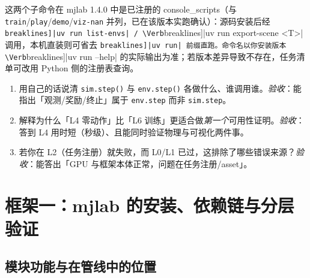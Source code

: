 \begin{note}
这两个子命令在 mjlab 1.4.0 中是已注册的 console\_scripts（与 \verb|train|/\allowbreak\verb|play|/\allowbreak\verb|demo|/\allowbreak\verb|viz-nan| 并列，已在该版本实跑确认）：源码安装后经 \Verb[breaklines]|uv run list-envs| / \Verb[breaklines]|uv run export-scene <T>| 调用，本机直装则可省去 \Verb[breaklines]|uv run| 前缀直跑。命令名以你安装版本 \Verb[breaklines]|uv run --help| 的实际输出为准；若版本差异导致不存在，任务清单可改用 Python 侧的注册表查询。
\end{note}


\begin{practice}[概念主线自检]
\begin{enumerate}
  \item 用自己的话说清 \verb|sim.step()| 与 \verb|env.step()| 各做什么、谁调用谁。\emph{验收}：能指出「观测/奖励/终止」属于 \verb|env.step| 而非 \verb|sim.step|。
  \item 解释为什么「L4 零动作」比「L6 训练」更适合做\emph{第一个}可用性证明。\emph{验收}：答到 L4 用时短（秒级）、且能同时验证物理与可视化两件事。
  \item 若你在 L2（任务注册）就失败，而 L0/L1 已过，这排除了哪些错误来源？\emph{验收}：能答出「GPU 与框架本体正常，问题在任务注册/asset」。
\end{enumerate}
\end{practice}

\section{框架一：mjlab 的安装、依赖链与分层验证}
\label{sec:rlmc-setup-mjlab}

\subsection{模块功能与在管线中的位置}

